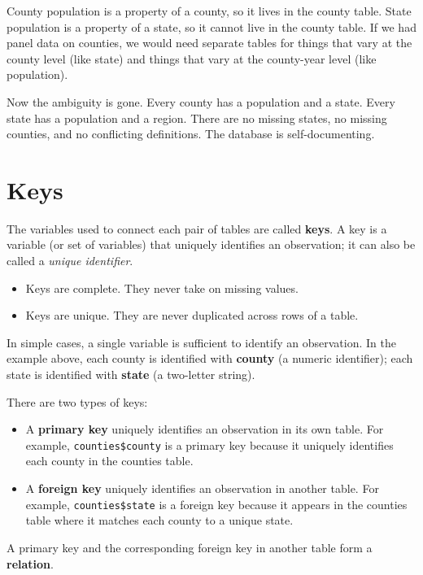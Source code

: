 \documentclass[]{book}
\providecommand{\tightlist}{%
  \setlength{\itemsep}{0pt}\setlength{\parskip}{0pt}}
\begin{document}
County population is a property of a county, so it lives in the county
table. State population is a property of a state, so it cannot live in
the county table. If we had panel data on counties, we would need
separate tables for things that vary at the county level (like state)
and things that vary at the county-year level (like population).

Now the ambiguity is gone. Every county has a population and a state.
Every state has a population and a region. There are no missing states,
no missing counties, and no conflicting definitions. The database is
self-documenting.

\section{Keys}\label{keys}

The variables used to connect each pair of tables are called
\textbf{keys}. A key is a variable (or set of variables) that uniquely
identifies an observation; it can also be called a \emph{unique
identifier}.

\begin{itemize}
\tightlist
\item
  Keys are complete. They never take on missing values.
\item
  Keys are unique. They are never duplicated across rows of a table.
\end{itemize}

In simple cases, a single variable is sufficient to identify an
observation. In the example above, each county is identified with
\textbf{county} (a numeric identifier); each state is identified with
\textbf{state} (a two-letter string).

There are two types of keys:

\begin{itemize}
\item
  A \textbf{primary key} uniquely identifies an observation in its own
  table. For example, \texttt{counties\$county} is a primary key because
  it uniquely identifies each county in the counties table.
\item
  A \textbf{foreign key} uniquely identifies an observation in another
  table. For example, \texttt{counties\$state} is a foreign key because
  it appears in the counties table where it matches each county to a
  unique state.
\end{itemize}

A primary key and the corresponding foreign key in another table form a
\textbf{relation}.
\end{document}
